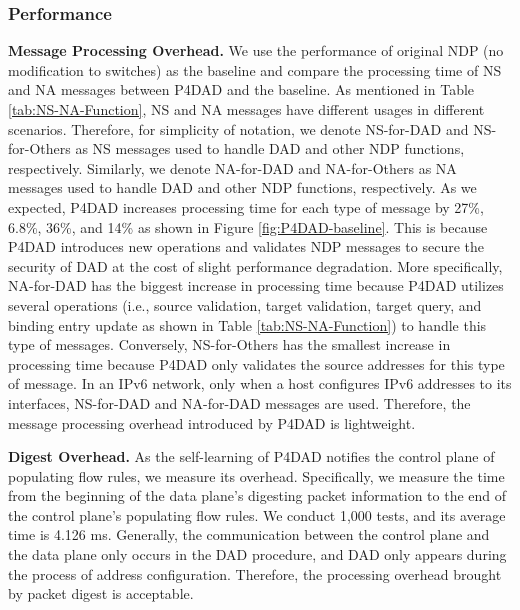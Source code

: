 \documentclass[journal]{IEEEtran}
\begin{document}
        \subsubsection{Performance}
            \textbf{Message Processing Overhead.} We use the performance of original NDP (no modification to switches) as the baseline and compare the processing time of NS and NA messages between P4DAD and the baseline. 
            As mentioned in Table \ref{tab:NS-NA-Function}, NS and NA messages have different usages in different scenarios. Therefore, for simplicity of notation, we denote NS-for-DAD and NS-for-Others as NS messages used to handle DAD and other NDP functions, respectively. Similarly, we denote NA-for-DAD and NA-for-Others as NA messages used to handle DAD and other NDP functions, respectively. As we expected, P4DAD increases processing time for each type of message by 27\%, 6.8\%, 36\%, and 14\% as shown in Figure \ref{fig:P4DAD-baseline}. This is because P4DAD introduces new operations and validates NDP messages to secure the security of DAD at the cost of slight performance degradation. More specifically, NA-for-DAD has the biggest increase in processing time because P4DAD utilizes several operations (i.e., source validation, target validation, target query, and binding entry update as shown in Table \ref{tab:NS-NA-Function}) to handle this type of messages. Conversely, NS-for-Others has the smallest increase in processing time because P4DAD only validates the source addresses for this type of message. In an IPv6 network, only when a host configures IPv6 addresses to its interfaces, NS-for-DAD and NA-for-DAD messages are used. Therefore, the message processing overhead introduced by P4DAD is lightweight.

            \textbf{Digest Overhead.} As the self-learning of P4DAD notifies the control plane of populating flow rules, we measure its overhead. Specifically, we measure the time from the beginning of the data plane's digesting packet information to the end of the control plane's populating flow rules. We conduct 1,000 tests, and its average time is 4.126 ms.
            Generally, the communication between the control plane and the data plane only occurs in the DAD procedure, and DAD only appears during the process of address configuration.
            Therefore, the processing overhead brought by packet digest is acceptable.

            
\end{document}
